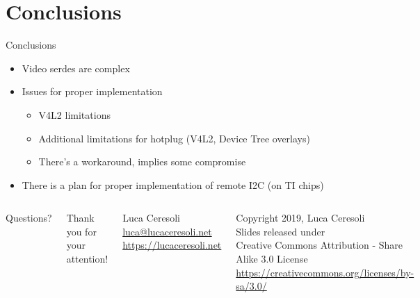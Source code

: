 \documentclass[xetex,table,aspectratio=169]{beamer}
\begin{document}
\section{Conclusions}

\begin{frame}{Conclusions}
  \begin{itemize}
  \item Video serdes are complex
  \item Issues for proper implementation
    \begin{itemize}
    \item V4L2 limitations
    \item Additional limitations for hotplug (V4L2, Device Tree overlays)
    \item There's a workaround, implies some compromise
    \end{itemize}
  \item There is a plan for proper implementation of remote I2C (on TI chips)
  \end{itemize}
\end{frame}

\begin{frame}
  \begin{columns}
    \center

    {\Huge Questions?}

    \center

    {\Large Thank you for your attention!}

    \vspace{0.15\textheight}

    {\Large Luca Ceresoli}\\
    \href{mailto:luca@lucaceresoli.net}{luca@lucaceresoli.net}\\
    \url{https://lucaceresoli.net}

    \vspace{0.05\textheight}

    \tiny
    \textcopyright{} Copyright 2019, Luca Ceresoli\\
    Slides released under\\
    Creative Commons Attribution - Share Alike 3.0 License \\
    \url{https://creativecommons.org/licenses/by-sa/3.0/} \\
\end{columns}
\end{frame}
\end{document}
